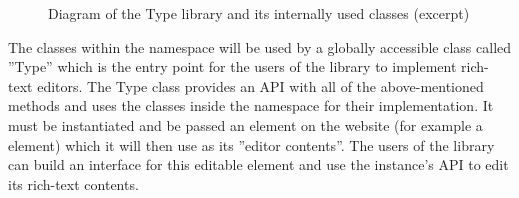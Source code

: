 \begin{figure}[!htb]
\centering
{}
\caption{Diagram of the Type library and its internally used classes (excerpt)}
\label{fig:type_uml_excerpt}
\end{figure}

The classes within the namespace will be used by a globally accessible class called ''Type'' which is the entry point for the users of the library to implement rich-text editors. The Type class provides an API with all of the above-mentioned methods and uses the classes inside the namespace for their implementation. It must be instantiated and be passed an element on the website (for example a  element) which it will then use as its ''editor contents''. The users of the library can build an interface for this editable element and use the instance's API to edit its rich-text contents.




